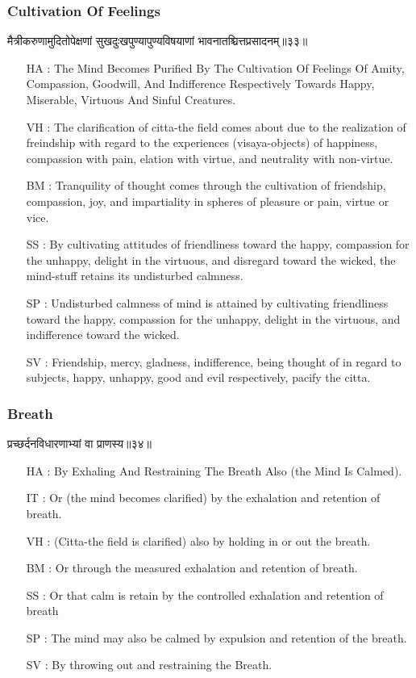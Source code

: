 \begin{frame}[fragile]\frametitle{Cultivation Of Feelings}
\begin{sanskrit}
मैत्रीकरुणामुदितोपेक्षणां सुखदुःखपुण्यापुण्यविषयाणां भावनातश्चित्तप्रसादनम्॥३३॥
\end{sanskrit}

	\begin{itemize}
	\item [HA]: The Mind Becomes Purified By The Cultivation Of Feelings Of Amity, Compassion, Goodwill, And Indifference Respectively Towards Happy, Miserable, Virtuous And Sinful Creatures.
	\item [VH]: The clarification of citta-the field comes about due to the realization of freindship with regard to the experiences (visaya-objects) of happiness, compassion with pain, elation with virtue, and neutrality with non-virtue.
	\item [BM]: Tranquility of thought comes through the cultivation of friendship, compassion, joy, and impartiality in spheres of pleasure or pain, virtue or vice.
	\item [SS]: By cultivating attitudes of friendliness toward the happy, compassion for the unhappy, delight in the virtuous, and disregard toward the wicked, the mind-stuff retains its undisturbed calmness.
	\item [SP]: Undisturbed calmness of mind is attained by cultivating friendliness toward the happy, compassion for the unhappy, delight in the virtuous, and indifference toward the wicked.
	\item [SV]: Friendship, mercy, gladness, indifference, being thought of in regard to subjects, happy, unhappy, good and evil respectively, pacify the citta. 
	\end{itemize}
\end{frame}


\begin{frame}[fragile]\frametitle{Breath}
\begin{sanskrit}
प्रच्छर्दनविधारणाभ्यां वा प्राणस्य॥३४॥
\end{sanskrit}

	\begin{itemize}
	\item [HA]: By Exhaling And Restraining The Breath Also (the Mind Is Calmed).
	\item [IT]: Or (the mind becomes clarified) by the exhalation and retention of breath.
	\item [VH]: (Citta-the field is clarified) also by holding in or out the breath.
	\item [BM]: Or through the measured exhalation and retention of breath.
	\item [SS]: Or that calm is retain by the controlled exhalation and retention of breath
	\item [SP]: The mind may also be calmed by expulsion and retention of the breath.
	\item [SV]: By throwing out and restraining the Breath. 
	\end{itemize}
\end{frame}


